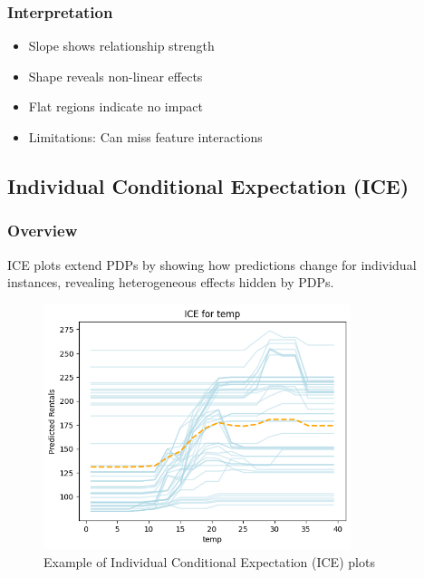 \documentclass{article}
\begin{document}
\subsubsection{Interpretation}
\begin{itemize}
    \item Slope shows relationship strength
    \item Shape reveals non-linear effects
    \item Flat regions indicate no impact
    \item Limitations: Can miss feature interactions
\end{itemize}

\subsection{Individual Conditional Expectation (ICE)}

\subsubsection{Overview}
ICE plots extend PDPs by showing how predictions change for individual instances, revealing heterogeneous effects hidden by PDPs.

\begin{figure}[h]
    \centering
    \includegraphics[width=0.8\textwidth]{images/ice.png}
    \caption{Example of Individual Conditional Expectation (ICE) plots}
    \label{fig:ice}
\end{figure}
\end{document}
